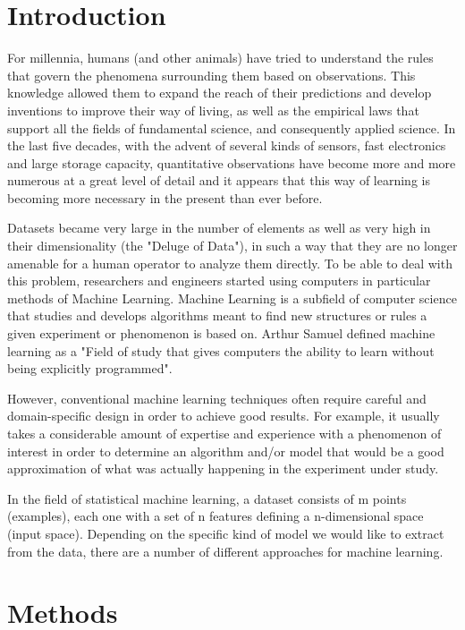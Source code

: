 \section{Introduction}
For millennia, humans (and other animals) have tried to understand the rules that govern the phenomena surrounding them based on observations. This knowledge allowed them to expand the reach of their predictions and develop inventions to improve their way of living, as well as the empirical laws that support all the fields of fundamental science, and consequently applied science. In the last five decades, with the advent of several kinds of sensors, fast electronics and large storage capacity, quantitative observations have become more and more numerous at a great level of detail and it appears that this way of learning is becoming more necessary in the present than ever before.

Datasets became very large in the number of elements as well as very high in their dimensionality (the "Deluge of Data"), in such a way that they are no longer amenable for a human operator to analyze them directly. To be able to deal with this problem, researchers and engineers started using computers in particular methods of Machine Learning. Machine Learning is a subfield of computer science that studies and develops algorithms meant to find new structures or rules a given experiment or phenomenon is based on. Arthur Samuel defined machine learning as a "Field of study that gives computers the ability to learn without being explicitly programmed".

However, conventional machine learning techniques often require careful and domain-specific design in order to achieve good results. For example, it usually takes a considerable amount of expertise and experience with a phenomenon of interest in order to determine an algorithm and/or model that would be a good approximation of what was actually happening in the experiment under study.

In the field of statistical machine learning, a dataset consists of m points (examples), each one with a set of n features defining a n-dimensional space (input space). Depending on the specific kind of model we would like to extract from the data, there are a number of different approaches for machine learning.

\section{Methods}

